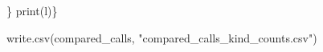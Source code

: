 \documentclass[
]{article}
\newenvironment{Shaded}{\begin{snugshade}}{\end{snugshade}}
\newcommand{\FunctionTok}[1]{\textcolor[rgb]{0.00,0.00,0.00}{#1}}
\newcommand{\NormalTok}[1]{#1}
\newcommand{\StringTok}[1]{\textcolor[rgb]{0.31,0.60,0.02}{#1}}
\begin{document}
\begin{Shaded}
\begin{Highlighting}[]
\NormalTok{  \} }
  \FunctionTok{print}\NormalTok{(l)\}}



\FunctionTok{write.csv}\NormalTok{(compared\_calls, }\StringTok{"compared\_calls\_kind\_counts.csv"}\NormalTok{)}
\end{Highlighting}
\end{Shaded}
\end{document}

